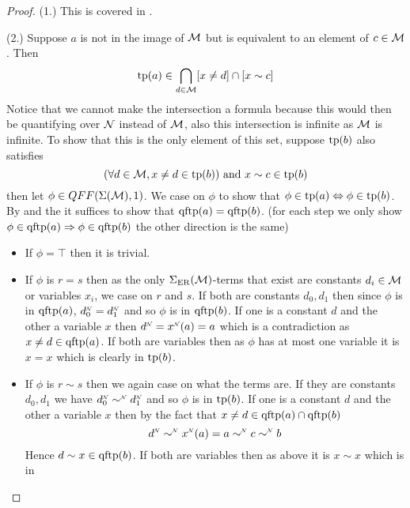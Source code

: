 \begin{proof}
    (1.) This is covered in .
    
    (2.)
    Suppose $a$ is not in the image of $\mathcal{M}$ but is equivalent to 
    an element of $c \in \mathcal{M}$.
    Then 
    \[\operatorname{tp}(a) \in \bigcap_{d \in \mathcal{M}} [x \ne d] \cap [x \sim c]\]
    Notice that we cannot make the intersection a formula because 
    this would then be quantifying over $\mathcal{N}$ instead of $\mathcal{M}$,
    also this intersection is infinite as $\mathcal{M}$ is infinite.
    To show that this is the only element of this set, 
    suppose $\operatorname{tp}(b)$ also satisfies 
    \[(\forall d \in \mathcal{M}, x \ne d \in \operatorname{tp}(b)) \text{ and } x \sim c \in \operatorname{tp}(b)\]
    then let $\phi \in QFF(\Sigma(\mathcal{M}),1)$.
    We case on $\phi$ to show that $\phi \in \operatorname{tp}(a) \Leftrightarrow \phi \in \operatorname{tp}(b)$.
    By  and the 
    it suffices to show that $\operatorname{qftp}(a) = \operatorname{qftp}(b)$.
    (for each step we only show $\phi \in \operatorname{qftp}(a) \Rightarrow \phi \in \operatorname{qftp}(b)$
    the other direction is the same)
    \begin{itemize}
        \item If $\phi = \top$ then it is trivial.
        \item If $\phi$ is $r = s$ then as the only $\Sigma_{\mathrm{ER}}(\mathcal{M})$-terms 
            that exist are constants $d_i \in \mathcal{M}$ or variables $x_i$, 
            we case on $r$ and $s$.
            If both are constants $d_0, d_1$ then since $\phi$ is in $\operatorname{qftp}(a)$,
            $\nnintp{d_0} = \nnintp{d_1}$ and so $\phi$ is in $\operatorname{qftp}(b)$.
            If one is a constant $d$ and the other a variable $x$ then 
            $\nnintp{d} = \nnintp{x}(a) = a$ which is a contradiction as 
            $x \ne d \in \operatorname{qftp}(a)$.
            If both are variables then as $\phi$ has at most one variable it 
            is $x = x$ which is clearly in $\operatorname{tp}(b)$.
        \item If $\phi$ is $r \sim s$ then we again case on what the terms are.
            If they are constants $d_0,d_1$ 
            we have $\nnintp{d_0} \nnintp{\sim} \nnintp{d_1}$ 
            and so $\phi$ is in $\operatorname{tp}(b)$.
            If one is a constant $d$ and the other a variable $x$ then by 
            the fact that $x \ne d \in \operatorname{qftp}(a) \cap \operatorname{qftp}(b)$ 
            \[\nnintp{d} \nnintp{\sim} \nnintp{x}(a) = a 
            \nnintp{\sim} c \nnintp{\sim} b\]
            Hence $d \sim x \in \operatorname{qftp}(b)$.
            If both are variables then as above it is $x \sim x$ which is in 

\end{itemize}
\end{proof}
